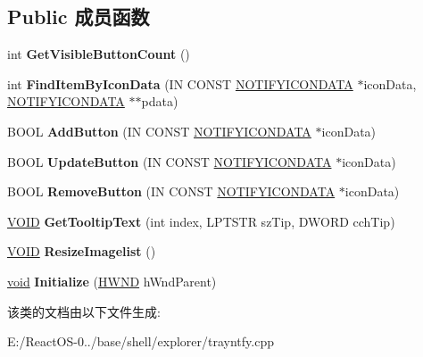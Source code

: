 \subsection*{Public 成员函数}
\begin{DoxyCompactItemize}
\item 
\mbox{\label{class_c_notify_toolbar_a23e43bb42e2165373599efdff86e2eee}} 
int {\bfseries Get\+Visible\+Button\+Count} ()
\item 
\mbox{\label{class_c_notify_toolbar_a2976c53f09119a06735657229eb31bf8}} 
int {\bfseries Find\+Item\+By\+Icon\+Data} (IN C\+O\+N\+ST \hyperlink{struct___n_o_t_i_f_y_i_c_o_n_d_a_t_a_a}{N\+O\+T\+I\+F\+Y\+I\+C\+O\+N\+D\+A\+TA} $\ast$icon\+Data, \hyperlink{struct___n_o_t_i_f_y_i_c_o_n_d_a_t_a_a}{N\+O\+T\+I\+F\+Y\+I\+C\+O\+N\+D\+A\+TA} $\ast$$\ast$pdata)
\item 
\mbox{\label{class_c_notify_toolbar_a78c688d066e1aa42796b019b818371b4}} 
B\+O\+OL {\bfseries Add\+Button} (IN C\+O\+N\+ST \hyperlink{struct___n_o_t_i_f_y_i_c_o_n_d_a_t_a_a}{N\+O\+T\+I\+F\+Y\+I\+C\+O\+N\+D\+A\+TA} $\ast$icon\+Data)
\item 
\mbox{\label{class_c_notify_toolbar_a13f358df470335186777a146412daea6}} 
B\+O\+OL {\bfseries Update\+Button} (IN C\+O\+N\+ST \hyperlink{struct___n_o_t_i_f_y_i_c_o_n_d_a_t_a_a}{N\+O\+T\+I\+F\+Y\+I\+C\+O\+N\+D\+A\+TA} $\ast$icon\+Data)
\item 
\mbox{\label{class_c_notify_toolbar_a0840b7eeb63b2466a56170cfef717634}} 
B\+O\+OL {\bfseries Remove\+Button} (IN C\+O\+N\+ST \hyperlink{struct___n_o_t_i_f_y_i_c_o_n_d_a_t_a_a}{N\+O\+T\+I\+F\+Y\+I\+C\+O\+N\+D\+A\+TA} $\ast$icon\+Data)
\item 
\mbox{\label{class_c_notify_toolbar_ac47cad020538097e2485f456dd1bc45e}} 
\hyperlink{interfacevoid}{V\+O\+ID} {\bfseries Get\+Tooltip\+Text} (int index, L\+P\+T\+S\+TR sz\+Tip, D\+W\+O\+RD cch\+Tip)
\item 
\mbox{\label{class_c_notify_toolbar_aae0bfba65874b2e9534baf96129088d4}} 
\hyperlink{interfacevoid}{V\+O\+ID} {\bfseries Resize\+Imagelist} ()
\item 
\mbox{\label{class_c_notify_toolbar_a8715a06531abfdd24160be9ff3dc005c}} 
\hyperlink{interfacevoid}{void} {\bfseries Initialize} (\hyperlink{interfacevoid}{H\+W\+ND} h\+Wnd\+Parent)
\end{DoxyCompactItemize}


该类的文档由以下文件生成\+:\begin{DoxyCompactItemize}
\item 
E\+:/\+React\+O\+S-\/0../base/shell/explorer/trayntfy.\+cpp\end{DoxyCompactItemize}
